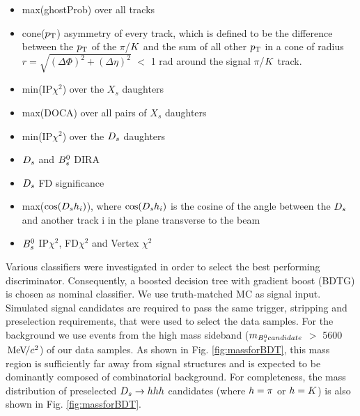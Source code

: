 \begin{itemize} 

\item max(ghostProb) over all tracks

\item cone($\mbox{$p_{\mathrm{ T}}$}$) asymmetry of every track, 
which is defined to be the difference between the $\mbox{$p_{\mathrm{ T}}$}$ of the $\pi$/${K}$ and the sum of all other $\mbox{$p_{\mathrm{ T}}$}$ in a cone of radius $r = \sqrt{(\Delta\Phi)^{2} + (\Delta\eta)^{2}}$ $<$ 1 rad around the signal $\pi$/${K}$ track.

\item min(IP$\chi^{2}$) over the $X_{s}$ daughters

\item max(DOCA) over all pairs of $X_{s}$ daughters

\item min(IP$\chi^{2}$) over the ${{D}_{s}}$ daughters

\item ${{D}_{s}}$ and ${{B}^0_{s}}$ DIRA

\item ${{D}_{s}}$ FD significance

\item max($\cos({{D}_{s}} h_{i})$), where $\cos({{D}_{s}} h_{i})$ is the cosine of the angle between the ${{D}_{s}}$ and another track i in the plane transverse to the beam

\item ${{B}^0_{s}}$ IP$\chi^{2}$, FD$\chi^{2}$ and Vertex $\chi^{2}$

\end{itemize}

Various classifiers were investigated in order to select the best performing discriminator. Consequently, a boosted decision tree with gradient boost (BDTG) is chosen as nominal classifier. 
We use truth-matched MC as signal input. 
Simulated signal candidates are required to pass the same trigger, stripping and preselection requirements, that were used to select the data samples.  
For the background we use events from the high mass sideband ($m_{{{B}^0_{s}} candidate}$ $>$ 5600 ${\mathrm{\,Me\kern -0.1em V\!/}c^2}$) of our data samples. 
As shown in Fig. \ref{fig:massforBDT}, this mass region is sufficiently far away from signal structures and is expected to be dominantly composed of combinatorial background.
For completeness, the mass distribution of preselected ${{D}_{s}}\rightarrow{\ensuremath{h}}{\ensuremath{h}}{\ensuremath{h}}$ candidates (where ${h} = {\pi}$ or ${h} = {K}$) is also shown in Fig. \ref{fig:massforBDT}.    \newline

